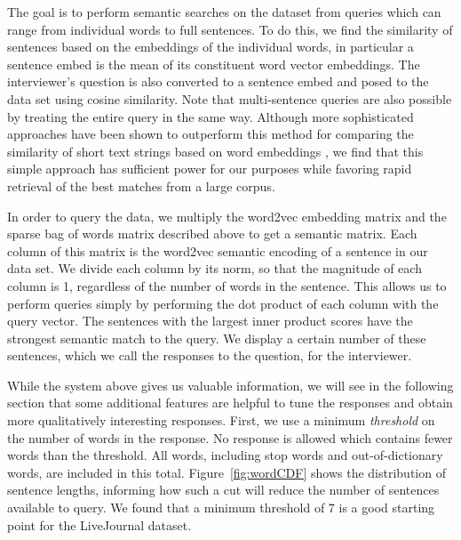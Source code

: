 \documentclass{sigchi}
\begin{document}
The goal is to perform semantic searches on the dataset from queries which can range from individual words to full sentences. To do this, we find the similarity of sentences based on the embeddings of the individual words, in particular a sentence embed is the mean of its constituent word vector embeddings. The interviewer's question is also converted to a sentence embed and posed to the data set using cosine similarity. Note that multi-sentence queries are also possible by treating the entire query in the same way. Although more sophisticated approaches have been shown to outperform this method for comparing the similarity of short text strings based on word embeddings \cite{kenter15short}, we find that this simple approach has sufficient power for our purposes while favoring rapid retrieval of the best matches from a large corpus. 

In order to query the data, we multiply the word2vec embedding matrix and the sparse bag of words matrix described above to get a semantic matrix. Each column of this matrix is the word2vec semantic encoding of a sentence in our data set. We divide each column by its norm, so that the magnitude of each column is 1, regardless of the number of words in the sentence. This allows us to perform queries simply by performing the dot product of each column with the query vector. The sentences with the largest inner product scores have the strongest semantic match to the query. We display a certain number of these sentences, which we call the responses to the question, for the interviewer.

While the system above gives us valuable information, we will see in the following section that some additional features are helpful to tune the responses and obtain more qualitatively interesting responses. First, we use a minimum {\em threshold} on the number of words in the response. No response is allowed which contains fewer words than the threshold. All words, including stop words and out-of-dictionary words, are included in this total. Figure~\ref{fig:wordCDF} shows the distribution of sentence lengths, informing how such a cut will reduce the number of sentences available to query. We found that a minimum threshold of 7 is a good starting point for the LiveJournal dataset.
\end{document}
